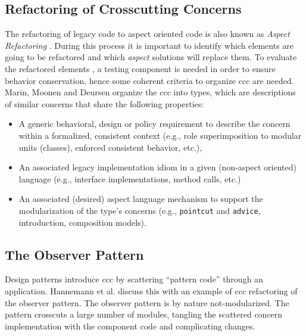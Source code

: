 \subsection{Refactoring of Crosscutting Concerns}\label{Refactoring of ccc}
The refactoring of legacy code to aspect oriented code is also known as \textit{Aspect Refactoring} \cite{marin2005approach}. 
During this process it is important to identify which elements are going to be refactored and which \textit{aspect} solutions will replace them. 
To evaluate the refactored elements \cite{fowler2009refactoring}, a testing component is needed in order to ensure behavior conservation, hence some coherent criteria to organize \ac{ccc} are needed. 
Marin, Moonen and Deursen \cite{marin2005approach} organize the \ac{ccc} into types, which are descriptions of similar concerns that share the following properties: 

\begin{itemize}
	\item A generic behavioral, design or policy requirement to describe the concern within a formalized, consistent context (e.g., role superimposition to modular units (classes), enforced consistent behavior, etc.),

	\item An associated legacy implementation idiom in a given (non-aspect oriented) language (e.g., interface implementations, method calls, etc.)

	\item An associated (desired) aspect language mechanism to support the modularization of the type's concerns (e.g., \texttt{pointcut} and \texttt{advice}, introduction, composition models).
\end{itemize}

\subsection{The Observer Pattern}\label{The Observer Pattern}
Design patterns introduce \ac{ccc} by scattering ``pattern code'' through an application.
Hannemann et al. \cite{hannemann2005role} discuss this with an example of \ac{ccc} refactoring of the observer pattern.
The observer pattern is by nature not-modularized. 
The pattern crosscuts a large number of modules, tangling the scattered concern implementation with the component code and complicating changes.

